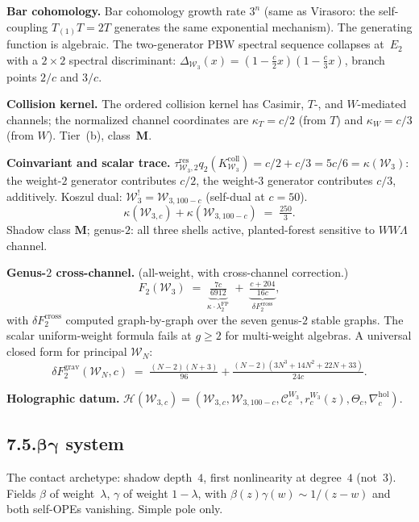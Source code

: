 \documentclass[11pt,reqno]{amsart}
\theoremstyle{definition}
\theoremstyle{remark}
\providecommand{\cC}{\mathcal{C}}
\providecommand{\cH}{\mathcal{H}}
\providecommand{\cW}{\mathcal{W}}
\providecommand{\hol}{\mathrm{hol}}
\providecommand{\FP}{\mathrm{FP}}
\providecommand{\FP}{\mathrm{FP}}
\numberwithin{equation}{section}
\begin{document}
\medskip\noindent\textbf{Bar cohomology.}\enspace
Bar cohomology growth rate $3^n$ (same as Virasoro: the
self-coupling $T_{(1)}T=2T$ generates the same exponential
mechanism). The generating function is algebraic. The
two-generator PBW spectral sequence collapses at~$E_2$
with a $2\times 2$ spectral discriminant:
$\Delta_{\cW_3}(x)=(1-\tfrac{c}{2}x)(1-\tfrac{c}{3}x)$,
branch points $2/c$ and $3/c$.

\medskip\noindent\textbf{Collision kernel.}\enspace
The ordered collision kernel has Casimir, $T$-, and
$W$-mediated channels; the normalized channel coordinates are
$\kappa_T=c/2$ (from $T$) and $\kappa_W=c/3$ (from $W$).
Tier~(b), class~$\mathbf{M}$.

\medskip\noindent\textbf{Coinvariant and scalar trace.}\enspace
$\tau_{\cW_3,2}^{\mathrm{res}}q_2(K_{\cW_3}^{\mathrm{coll}})
=c/2+c/3=5c/6=\kappa(\cW_3)$:
the weight-$2$ generator contributes $c/2$, the weight-$3$
generator contributes $c/3$, additively.
Koszul dual: $\cW_3^!=\cW_{3,100-c}$ (self-dual at $c=50$).
\[
\kappa(\cW_{3,c})+\kappa(\cW_{3,100-c})\;=\;\tfrac{250}{3}.
\]
Shadow class $\mathbf M$; genus-$2$: all three shells active,
planted-forest sensitive to $WW\Lambda$ channel.

\medskip\noindent\textbf{Genus-$2$ cross-channel.}\enspace
(all-weight, with cross-channel correction.)
\begin{equation}\label{eq:w3-genus2-b}
F_2(\cW_3)
\;=\;
\underbrace{\tfrac{7c}{6912}}_{\kappa\cdot\lambda_2^{\FP}}
\;+\;
\underbrace{\tfrac{c+204}{16c}}_{\delta F_2^{\mathrm{cross}}},
\end{equation}
with $\delta F_2^{\mathrm{cross}}$ computed graph-by-graph over
the seven genus-$2$ stable graphs. The scalar uniform-weight
formula fails at $g\ge 2$ for multi-weight algebras.
A universal closed form for principal $\cW_N$:
\[
\delta F_2^{\mathrm{grav}}(\cW_N,c)
\;=\;
\tfrac{(N-2)(N+3)}{96}
+\tfrac{(N-2)(3N^3+14N^2+22N+33)}{24c}.
\]

\medskip\noindent\textbf{Holographic datum.}
$\cH(\cW_{3,c})=(\cW_{3,c},\cW_{3,100-c},\cC_c^{W_3},
r_c^{W_3}(z),\Theta_c,\nabla^{\hol}_c)$.

\subsection*{7.5.\quad \texorpdfstring{$\boldsymbol{\beta\gamma}$}{beta-gamma} system}

The contact archetype: shadow depth~$4$, first nonlinearity at
degree~$4$ (not~$3$). Fields $\beta$ of weight~$\lambda$,
$\gamma$ of weight $1-\lambda$, with
$\beta(z)\gamma(w)\sim 1/(z-w)$ and both self-OPEs vanishing.
Simple pole only.
\end{document}
